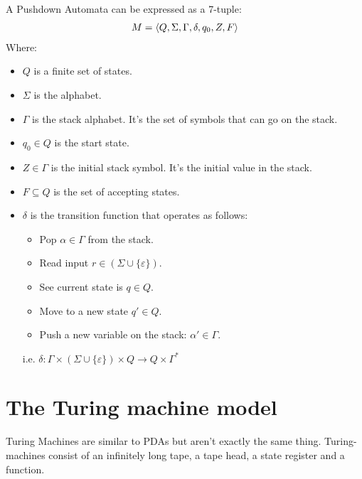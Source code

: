         A Pushdown Automata can be expressed as a 7-tuple:
        \begin{align*}
            M = \left \langle Q, \Sigma, \Gamma, \delta, q_0, Z, F \right \rangle 
        \end{align*}
        Where:
        \begin{itemize}
            \item $Q$ is a finite set of states.
            \item $\Sigma$ is the alphabet.
            \item $\Gamma$ is the stack alphabet. It's the set of symbols that
            can go on the stack.
            \item $q_0 \in Q$ is the start state.
            \item $Z \in \Gamma$ is the initial stack symbol. It's the initial
            value in the stack.
            \item $F \subseteq Q$ is the set of accepting states.
            \item $\delta$ is the transition function that operates as follows:
            \begin{itemize}
                \item Pop $\alpha \in \Gamma$ from the stack.
                \item Read input $r \in (\Sigma \cup \{ \varepsilon \})$.
                \item See current state is $q \in Q$.
                \item Move to a new state $q' \in Q$.
                \item Push a new variable on the stack: $\alpha' \in \Gamma$.
            \end{itemize}
            i.e. $\delta: \Gamma \times (\Sigma \cup \{ \varepsilon \}) \times Q \to Q \times \Gamma^*$
        \end{itemize}
    \section{The Turing machine model}
        Turing Machines are similar to PDAs but aren't exactly the same thing.
        Turing-machines consist of an infinitely long tape, a tape head, a state
        register and a function.

